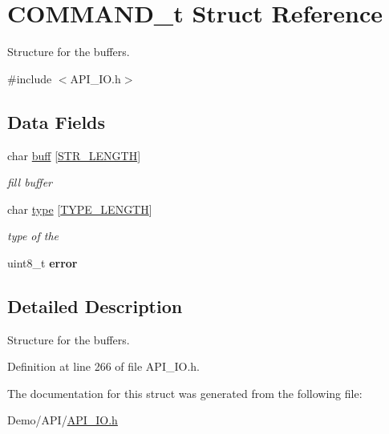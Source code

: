 \hypertarget{struct_c_o_m_m_a_n_d__t}{}\section{C\+O\+M\+M\+A\+N\+D\+\_\+t Struct Reference}
\label{struct_c_o_m_m_a_n_d__t}


Structure for the buffers.  




{\ttfamily \#include $<$A\+P\+I\+\_\+\+I\+O.\+h$>$}

\subsection*{Data Fields}
\begin{DoxyCompactItemize}
\item 
\mbox{\label{struct_c_o_m_m_a_n_d__t_a3ca56d05670fa13929584cd8aebae252}} 
char \hyperlink{struct_c_o_m_m_a_n_d__t_a3ca56d05670fa13929584cd8aebae252}{buff} \mbox{[}\hyperlink{_a_p_i___i_o_8h_a9e8aaf9c28f704136d8fc1ba043b6bf5}{S\+T\+R\+\_\+\+L\+E\+N\+G\+TH}\mbox{]}
\begin{DoxyCompactList}\small\item\em fill buffer \end{DoxyCompactList}\item 
\mbox{\label{struct_c_o_m_m_a_n_d__t_a106c2825d202a4530656fcd385d0c04b}} 
char \hyperlink{struct_c_o_m_m_a_n_d__t_a106c2825d202a4530656fcd385d0c04b}{type} \mbox{[}\hyperlink{_a_p_i___i_o_8h_a7be6924e0d85f3f82149ea31cca36887}{T\+Y\+P\+E\+\_\+\+L\+E\+N\+G\+TH}\mbox{]}
\begin{DoxyCompactList}\small\item\em type of the \end{DoxyCompactList}\item 
\mbox{\label{struct_c_o_m_m_a_n_d__t_adc64ccb7538429fe78e3fe0139267370}} 
uint8\+\_\+t {\bfseries error}
\end{DoxyCompactItemize}


\subsection{Detailed Description}
Structure for the buffers. 

Definition at line 266 of file A\+P\+I\+\_\+\+I\+O.\+h.



The documentation for this struct was generated from the following file\+:\begin{DoxyCompactItemize}
\item 
Demo/\+A\+P\+I/\hyperlink{_a_p_i___i_o_8h}{A\+P\+I\+\_\+\+I\+O.\+h}\end{DoxyCompactItemize}
